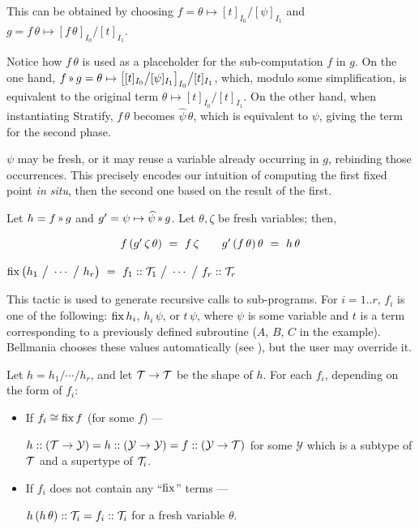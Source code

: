 This can be obtained by choosing 
$f=\theta\mapsto[t]_{I_0}\big/[\psi]_{I_1}$
and
$g=f\,\theta \mapsto [f\,\theta]_{I_0}\big/[t]_{I_1}$.

Notice how $f\,\theta$ is used as a placeholder for the sub-computation $f$ in $g$.
On the one hand, $f\applt g = \theta\mapsto\big[[t]_{I_0}\big/[\psi]_{I_1}\big]_{I_0}\big/[t]_{I_1}$, which,
modulo some simplification, is equivalent to the original term $\theta\mapsto[t]_{I_0}\big/[t]_{I_1}$.
On the other hand, when instantiating \textsf{Stratify}, $f\,\theta$ becomes $\widehat\psi\,\theta$, 
which is equivalent to $\psi$, giving the term for the second phase.

$\psi$ may be fresh, or it may reuse a variable already occurring in $g$, rebinding those occurrences.
This precisely encodes our intuition of computing the first fixed point \textit{in situ},
then the second one based on the result of the first.

\Obligations Let $h=f\applt g$ and $g'=\psi\mapsto\widehat\psi\applt g$. Let $\theta,\zeta$ be
fresh variables; then,\vspace{-.3em}
\begin{equation}
\renewcommand\arraystretch{1.5}
\begin{array}{l@{\qquad}l}
f\,(g'\,\zeta\,\theta) ~=~ f\,\zeta &
g'\,(f\,\theta)\,\theta ~=~ h\,\theta
\end{array}
\label{tactics:Stratify obligations}
\end{equation}


\vspace{.1em}
 \label{tactics:Synth}
$\operatorname{fix}\big(h_1 ~\big/~ \cdots ~\big/~ h_r\big) ~=~ 
  f_1 :: \mathcal{T}_1 ~\big/~ \cdots ~\big/~ f_r :: \mathcal{T}_r$

This tactic is used to generate recursive calls to sub-programs. For $i=1..r$, $f_i$
is one of the following: $\operatorname{fix} h_i$, $h_i\,\psi$, or $t\,\psi$, where $\psi$ is some
variable and $t$ is a term corresponding to a previously defined subroutine
($A$, $B$, $C$ in the example).
Bellmania chooses these values automatically (see ),
but the user may override it.

\newcommand\Y{\mathcal{Y}}

\Obligations Let $h=h_1/\cdots/h_r$, and let $\mathcal{T}\to\mathcal{T}$ be the shape of $h$. 
  For each $f_i$, depending on the form of $f_i$:
\begin{itemize}
  \item If $f_i \cong \operatorname{fix} f$ (for some $f$) --- \\
    \rule{0pt}{12pt}
    $h :: (\T \to \Y) = h :: (\Y \to \Y) = f :: (\Y \to \T)$
    for some $\Y$ which is a subtype of $\mathcal{T}$ and a supertype of $\mathcal{T}_i$.
  \item If $f_i$ does not contain any ``$\operatorname{fix}$'' terms ---\\
    \rule{0pt}{12pt}
    $h\,(h\,\theta) :: \mathcal{T}_i = f_i :: \mathcal{T}_i$ for a fresh variable $\theta$.
\end{itemize}

